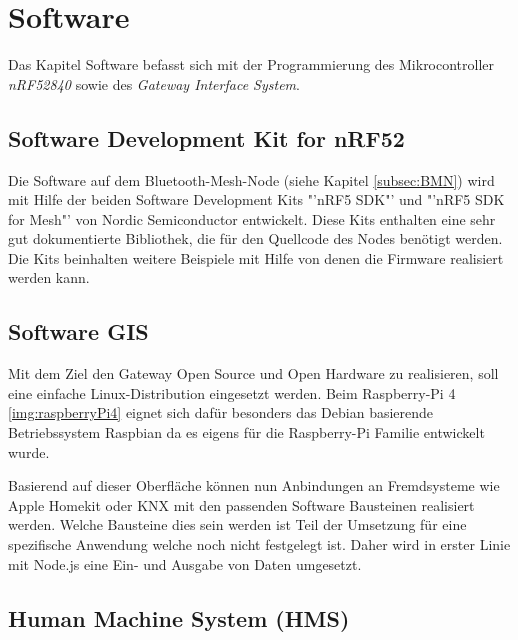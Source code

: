 \clearpage
\section{Software}\label{sec:Software}
Das Kapitel Software befasst sich mit der Programmierung des Mikrocontroller \textit{nRF52840} sowie des \textit{Gateway Interface System}.

\subsection{Software Development Kit for nRF52}\label{subsec:SDK}
Die Software auf dem Bluetooth-Mesh-Node (siehe Kapitel \ref{subsec:BMN})  wird mit Hilfe der beiden Software Development Kits "'nRF5 SDK"'\cite{nordic_semiconductor_nrf5_2019} und "'nRF5 SDK for Mesh"'\cite{nordic_semiconductor_nrf5_2019-1} von Nordic Semiconductor entwickelt. Diese Kits enthalten eine sehr gut dokumentierte Bibliothek, die für den Quellcode des Nodes benötigt werden. Die Kits beinhalten weitere Beispiele mit Hilfe von denen die Firmware realisiert werden kann.


\subsection{Software GIS}\label{subsec:SoftwareGIS}
Mit dem Ziel den Gateway Open Source und Open Hardware zu realisieren, soll eine einfache Linux-Distribution eingesetzt werden. Beim Raspberry-Pi 4 \ref{img:raspberryPi4} eignet sich dafür besonders das Debian basierende Betriebssystem Raspbian da es eigens für die Raspberry-Pi Familie entwickelt wurde.

Basierend auf dieser Oberfläche können nun Anbindungen an Fremdsysteme wie Apple Homekit oder KNX mit den passenden Software Bausteinen realisiert werden. Welche Bausteine dies sein werden ist Teil der Umsetzung für eine spezifische Anwendung welche noch nicht festgelegt ist. Daher wird in erster Linie mit Node.js eine Ein- und Ausgabe von Daten umgesetzt. 

\subsection{Human Machine System (HMS)}\label{subsec:HMS_SW}

